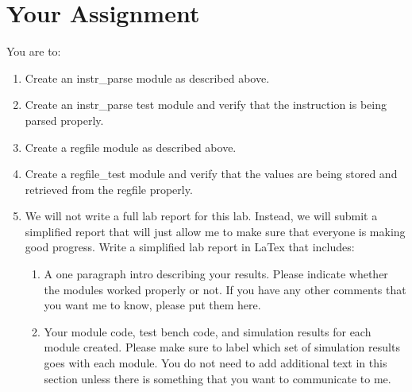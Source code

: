 \clearpage
\section{Your Assignment}

You are to:
\begin{enumerate}
\item Create an instr\_parse module as described above.
\item Create an instr\_parse test module and verify that the instruction is being parsed properly.
\item Create a regfile module as described above.
\item Create a regfile\_test module and verify that the values are being stored and retrieved from the regfile properly.
\item We will not write a full lab report for this lab.  Instead, we will submit a simplified report that will just allow me to make sure that everyone is making good progress.  Write a simplified lab report in LaTex that includes:
\begin{enumerate}
	\item  A one paragraph intro describing your results.  Please indicate whether the modules worked properly or not.  If you have any other comments that you want me to know, please put them here.
	\item Your module code, test bench code, and simulation results for each module created.  Please make sure to label which set of simulation results goes with each module.  You do not need to add additional text in this section unless there is something that you want to communicate to me.
\end{enumerate} 
\end{enumerate} 